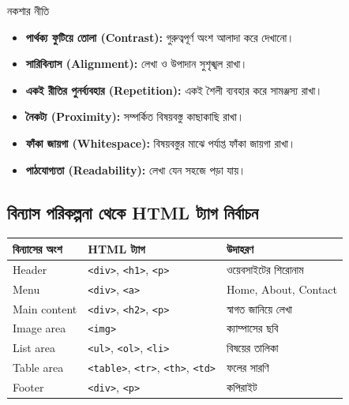 \begin{keypointbox}{নকশার নীতি}
\par\noindent
\begin{minipage}[t]{.48\linewidth}\vspace{0pt}
\begin{itemize}
\item \textbf{পার্থক্য ফুটিয়ে তোলা (Contrast):} গুরুত্বপূর্ণ অংশ আলাদা করে দেখানো।
\item \textbf{সারিবিন্যাস (Alignment):} লেখা ও উপাদান সুশৃঙ্খল রাখা।
\item \textbf{একই রীতির পুনর্ব্যবহার (Repetition):} একই শৈলী ব্যবহার করে সামঞ্জস্য রাখা।
\end{itemize}
\end{minipage}\hfill
\begin{minipage}[t]{.48\linewidth}\vspace{0pt}
\begin{itemize}
\item \textbf{নৈকট্য (Proximity):} সম্পর্কিত বিষয়বস্তু কাছাকাছি রাখা।
\item \textbf{ফাঁকা জায়গা (Whitespace):} বিষয়বস্তুর মাঝে পর্যাপ্ত ফাঁকা জায়গা রাখা।
\item \textbf{পাঠযোগ্যতা (Readability):} লেখা যেন সহজে পড়া যায়।
\end{itemize}
\end{minipage}\par

\end{keypointbox}



\subsection{বিন্যাস পরিকল্পনা থেকে HTML ট্যাগ নির্বাচন}

\begin{center}
\begin{tabular}{|p{}|p{}|p{}|}
\hline
\textbf{বিন্যাসের অংশ} & \textbf{HTML ট্যাগ} & \textbf{উদাহরণ} \\
\hline
Header & \texttt{<div>}, \texttt{<h1>}, \texttt{<p>} & ওয়েবসাইটের শিরোনাম \\
\hline
Menu & \texttt{<div>}, \texttt{<a>} & Home, About, Contact \\
\hline
Main content & \texttt{<div>}, \texttt{<h2>}, \texttt{<p>} & স্বাগত জানিয়ে লেখা \\
\hline
Image area & \texttt{<img>} & ক্যাম্পাসের ছবি \\
\hline
List area & \texttt{<ul>}, \texttt{<ol>}, \texttt{<li>} & বিষয়ের তালিকা \\
\hline
Table area & \texttt{<table>}, \texttt{<tr>}, \texttt{<th>}, \texttt{<td>} & ফলের সারণি \\
\hline
Footer & \texttt{<div>}, \texttt{<p>} & কপিরাইট \\
\hline
\end{tabular}
\end{center}

